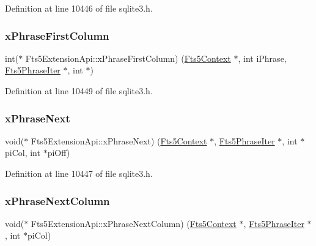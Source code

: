 Definition at line 10446 of file sqlite3.\+h.

\mbox{\label{struct_fts5_extension_api_ac57daf9650e3f0c25432bbe348bc124f}} 
\subsubsection{\texorpdfstring{x\+Phrase\+First\+Column}{xPhraseFirstColumn}}
{\footnotesize\ttfamily int($\ast$ Fts5\+Extension\+Api\+::x\+Phrase\+First\+Column) (\mbox{\hyperlink{sqlite3_8h_a97821b95ebebd43db901977ffd5b26bc}{Fts5\+Context}} $\ast$, int i\+Phrase, \mbox{\hyperlink{struct_fts5_phrase_iter}{Fts5\+Phrase\+Iter}} $\ast$, int $\ast$)}



Definition at line 10449 of file sqlite3.\+h.

\mbox{\label{struct_fts5_extension_api_ac46faf7ccccf6a02454069b296dc1877}} 
\subsubsection{\texorpdfstring{x\+Phrase\+Next}{xPhraseNext}}
{\footnotesize\ttfamily void($\ast$ Fts5\+Extension\+Api\+::x\+Phrase\+Next) (\mbox{\hyperlink{sqlite3_8h_a97821b95ebebd43db901977ffd5b26bc}{Fts5\+Context}} $\ast$, \mbox{\hyperlink{struct_fts5_phrase_iter}{Fts5\+Phrase\+Iter}} $\ast$, int $\ast$pi\+Col, int $\ast$pi\+Off)}



Definition at line 10447 of file sqlite3.\+h.

\mbox{\label{struct_fts5_extension_api_ae699a91c958cbac92a2ae8000670ef89}} 
\subsubsection{\texorpdfstring{x\+Phrase\+Next\+Column}{xPhraseNextColumn}}
{\footnotesize\ttfamily void($\ast$ Fts5\+Extension\+Api\+::x\+Phrase\+Next\+Column) (\mbox{\hyperlink{sqlite3_8h_a97821b95ebebd43db901977ffd5b26bc}{Fts5\+Context}} $\ast$, \mbox{\hyperlink{struct_fts5_phrase_iter}{Fts5\+Phrase\+Iter}} $\ast$, int $\ast$pi\+Col)}



